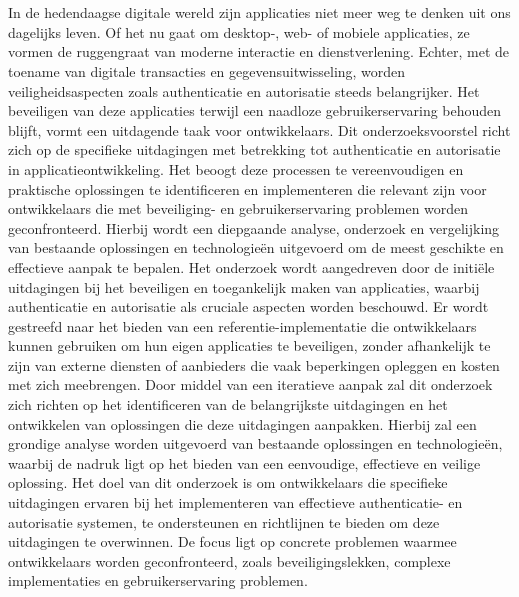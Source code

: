 
\chapter{}%
\label{ch:inleiding}

In de hedendaagse digitale wereld zijn applicaties niet meer weg te denken uit ons dagelijks leven. Of het nu gaat om desktop-, web- of mobiele applicaties, ze vormen de ruggengraat van moderne interactie 
en dienstverlening. Echter, met de toename van digitale transacties en gegevensuitwisseling, worden veiligheidsaspecten zoals authenticatie en autorisatie steeds belangrijker. Het beveiligen van deze applicaties 
terwijl een naadloze gebruikerservaring behouden blijft, vormt een uitdagende taak voor ontwikkelaars.
\newline
\newline
Dit onderzoeksvoorstel richt zich op de specifieke uitdagingen met betrekking tot authenticatie en autorisatie in applicatieontwikkeling. Het beoogt deze processen te vereenvoudigen en praktische oplossingen 
te identificeren en implementeren die relevant zijn voor ontwikkelaars die met beveiliging- en gebruikerservaring problemen worden geconfronteerd. Hierbij wordt een diepgaande analyse, onderzoek en 
vergelijking van bestaande oplossingen en technologieën uitgevoerd om de meest geschikte en effectieve aanpak te bepalen.
\newline
\newline
Het onderzoek wordt aangedreven door de initiële uitdagingen bij het beveiligen en toegankelijk maken van applicaties, waarbij authenticatie en autorisatie als cruciale aspecten worden beschouwd. 
Er wordt gestreefd naar het bieden van een referentie-implementatie die ontwikkelaars kunnen gebruiken om hun eigen applicaties te beveiligen, zonder afhankelijk te zijn van externe diensten of aanbieders die vaak beperkingen opleggen en kosten met zich meebrengen.
\newline
\newline
Door middel van een iteratieve aanpak zal dit onderzoek zich richten op het identificeren van de belangrijkste uitdagingen en het ontwikkelen van oplossingen die deze uitdagingen aanpakken. 
Hierbij zal een grondige analyse worden uitgevoerd van bestaande oplossingen en technologieën, waarbij de nadruk ligt op het bieden van een eenvoudige, effectieve en veilige oplossing.
\newline
\newline
Het doel van dit onderzoek is om ontwikkelaars die specifieke uitdagingen ervaren bij het implementeren van effectieve authenticatie- en autorisatie systemen, te ondersteunen en richtlijnen te bieden om deze uitdagingen te overwinnen.
De focus ligt op concrete problemen waarmee ontwikkelaars worden geconfronteerd, zoals beveiligingslekken, complexe implementaties en gebruikerservaring problemen.



